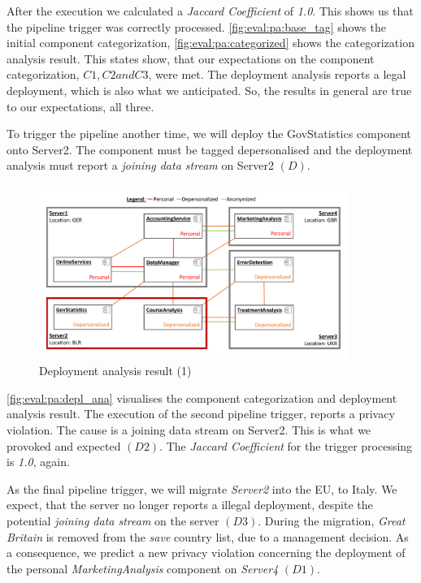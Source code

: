 After the execution we calculated a \textit{Jaccard Coefficient} of \textit{1.0}. This shows us that the pipeline trigger was correctly processed. \autoref{fig:eval:pa:base_tag} shows the initial component categorization, \autoref{fig:eval:pa:categorized} shows the categorization analysis result. This states show, that our expectations on the component categorization, $C1, C2 and C3$, were met. The deployment analysis reports a legal deployment, which is also what we anticipated. So, the results in general are true to our expectations, all three.

To trigger the pipeline another time, we will deploy the GovStatistics component onto Server2. The component must be tagged depersonalised and the deployment analysis must report a \textit{joining data stream} on Server2 $(D)$.

\begin{figure}[h]
	\centering
	\includegraphics[trim = 0mm 10mm 0mm 10mm, clip, width=0.90\textwidth]{graphs/medSys_eval_pa_da}
	\caption{Deployment analysis result (1)}
	\label{fig:eval:pa:depl_ana}
\end{figure}

\autoref{fig:eval:pa:depl_ana} visualises the component categorization and deployment analysis result. The execution of the second pipeline trigger, reports a privacy violation. The cause is a joining data stream on Server2. This is what we provoked and expected $(D2)$. The \textit{Jaccard Coefficient} for the trigger processing is \textit{1.0}, again.

As the final pipeline trigger, we will migrate \textit{Server2} into the EU, to Italy. We expect, that the server no longer reports a illegal deployment, despite the potential \textit{joining data stream} on the server $(D3)$. During the migration, \textit{Great Britain} is removed from the \textit{save} country list, due to a management decision. As a consequence, we predict a new privacy violation concerning the deployment of the personal \textit{MarketingAnalysis} component on \textit{Server4} $(D1)$.

